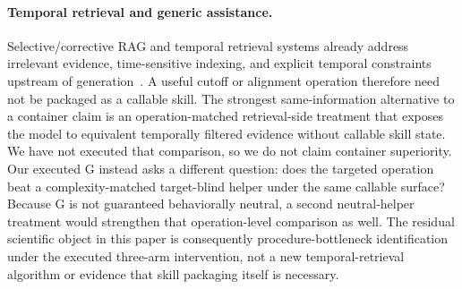 \paragraph{Temporal retrieval and generic assistance.}
Selective/corrective RAG and temporal retrieval systems already address irrelevant evidence, time-sensitive indexing, and explicit temporal constraints upstream of generation~\citep{asai2024selfrag,yan2024crag,zhang2025mrag,abdallah2026tempretriever,han2025temporalgraphs,wang2026iarag,liu2026chronos}. A useful cutoff or alignment operation therefore need not be packaged as a callable skill. The strongest same-information alternative to a container claim is an operation-matched retrieval-side treatment that exposes the model to equivalent temporally filtered evidence without callable skill state. We have not executed that comparison, so we do not claim container superiority. Our executed G instead asks a different question: does the targeted operation beat a complexity-matched target-blind helper under the same callable surface? Because G is not guaranteed behaviorally neutral, a second neutral-helper treatment would strengthen that operation-level comparison as well. The residual scientific object in this paper is consequently procedure-bottleneck identification under the executed three-arm intervention, not a new temporal-retrieval algorithm or evidence that skill packaging itself is necessary.
